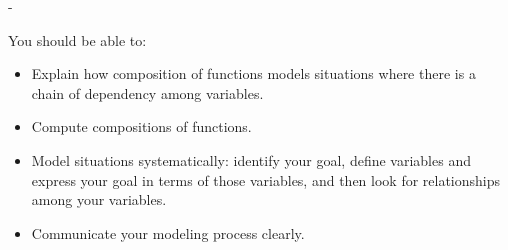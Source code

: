 \documentclass{article}
\makeatletter
\newlength{\tipmargin}
\renewenvironment{framed}{
  \setlength{\tipmargin}{\textwidth-\linewidth}
  \advance\@totalleftmargin-\tipmargin
  \def\FrameCommand{\hspace{\tipmargin}\fbox}%
  \advance\linewidth\tipmargin
  \MakeFramed {\advance\hsize-\width \FrameRestore}%
}
{\endMakeFramed}
\makeatother
\begin{document}

\begin{problemonly}
  \begin{framed}

You should be able to:
    \begin{itemize}[topsep=0pt,partopsep=0pt,parsep=8pt,itemsep=0pt]
    \item Explain how composition of functions models situations where there is a chain of dependency among variables.

    \item Compute compositions of functions.

    \item Model situations systematically: identify your goal, define variables and express your goal in terms of those variables, and then look for relationships among your variables.

    \item Communicate your modeling process clearly. 
    \end{itemize}
  \end{framed}
\end{problemonly}
\end{document}
